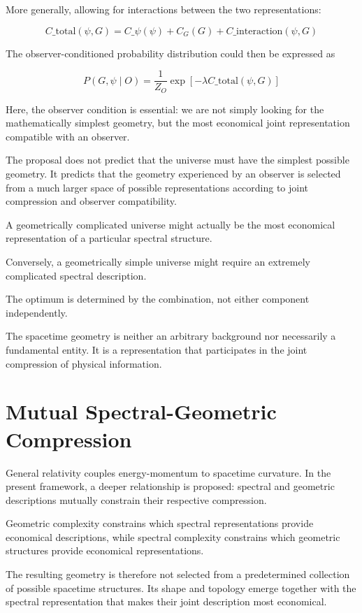 More generally, allowing for interactions between the two representations:

\[
C\_{\mathrm{total}}(\psi,G) = C\_{\psi}(\psi) + C_G(G) + C\_{\mathrm{interaction}}(\psi,G)
\]

The observer-conditioned probability distribution could then be expressed as

\[
P(G,\psi\mid O) = \frac{1}{Z_O} \exp\left[-\lambda C\_{\mathrm{total}}(\psi,G)\right]
\]

Here, the observer condition is essential: we are not simply looking for the mathematically simplest geometry, but the most economical joint representation compatible with an observer.


The proposal does not predict that the universe must have the simplest possible geometry.
It predicts that the geometry experienced by an observer is selected from a much larger space of possible representations according to joint compression and observer compatibility.

A geometrically complicated universe might actually be the most economical representation of a particular spectral structure.

Conversely, a geometrically simple universe might require an extremely complicated spectral description.

The optimum is determined by the combination, not either component independently.

The spacetime geometry is neither an arbitrary background nor necessarily a fundamental entity.
It is a representation that participates in the joint compression of physical information.




\section{Mutual Spectral-Geometric Compression}

General relativity couples energy-momentum to spacetime curvature.
In the present framework, a deeper relationship is proposed: spectral and geometric descriptions mutually constrain their respective compression.

Geometric complexity constrains which spectral representations provide economical descriptions, while spectral complexity constrains which geometric structures provide economical representations.

The resulting geometry is therefore not selected from a predetermined collection of possible spacetime structures.
Its shape and topology emerge together with the spectral representation that makes their joint description most economical.

